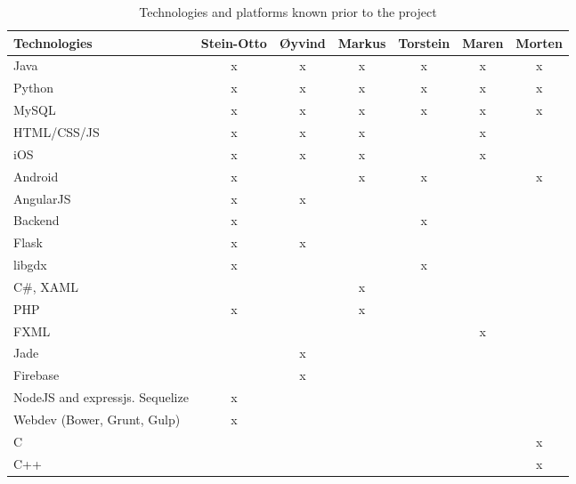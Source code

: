 \begin{table}[]
\centering
\begin{tabular}{|l|c|c|c|c|c|c|}
\hline
\textbf{Technologies} & \textbf{Stein-Otto} & \textbf{Øyvind} & \textbf{Markus} & \textbf{Torstein} & \textbf{Maren} & \textbf{Morten} \\ \hline
Java & x & x & x & x & x & x \\ \hline
Python & x & x & x & x & x & x \\ \hline
MySQL & x & x & x & x & x & x \\ \hline
HTML/CSS/JS & x & x & x &  & x &  \\ \hline
iOS & x & x & x &  & x &  \\ \hline
Android & x &  & x & x &  & x \\ \hline
AngularJS & x & x &  &  &  &  \\ \hline
Backend & x &  &  & x &  &  \\ \hline
Flask & x & x &  &  &  &  \\ \hline
libgdx & x &  &  & x &  &  \\ \hline
C\#, XAML &  &  & x &  &  &  \\ \hline
PHP & x &  & x &  &  &  \\ \hline
FXML &  &  &  &  & x &  \\ \hline
Jade &  & x &  &  &  &  \\ \hline
Firebase &  & x &  &  &  &  \\ \hline
NodeJS and expressjs. Sequelize & x &  &  &  &  &  \\ \hline
Webdev (Bower, Grunt, Gulp) & x &  &  &  &  &  \\ \hline
C &  &  &  &  &  & x \\ \hline
C++ &  &  &  &  &  & x \\ \hline
\end{tabular}
\caption{Technologies and platforms known prior to the project}
\label{table:prior-knowledge}
\end{table}